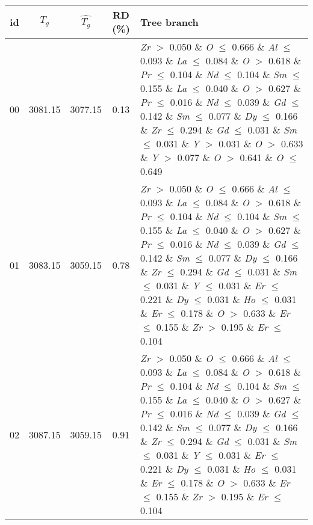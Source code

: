 \begin{table}[!htbp]
	\setlength{\tabcolsep}{3pt}
	\begin{tabular}{ccccp{}}
		\toprule
		id & $T_g$ & $\hat{T_g}$ & RD (\%) & Tree branch\\
		\midrule
		00 & 3081.15 & 3077.15 & 0.13 & \textit{Zr} $>$ 0.050 $\&$ \textit{O} $\le$ 0.666 $\&$ \textit{Al} $\le$ 0.093 $\&$ \textit{La} $\le$ 0.084 $\&$ \textit{O} $>$ 0.618 $\&$ \textit{Pr} $\le$ 0.104 $\&$ \textit{Nd} $\le$ 0.104 $\&$ \textit{Sm} $\le$ 0.155 $\&$ \textit{La} $\le$ 0.040 $\&$ \textit{O} $>$ 0.627 $\&$ \textit{Pr} $\le$ 0.016 $\&$ \textit{Nd} $\le$ 0.039 $\&$ \textit{Gd} $\le$ 0.142 $\&$ \textit{Sm} $\le$ 0.077 $\&$ \textit{Dy} $\le$ 0.166 $\&$ \textit{Zr} $\le$ 0.294 $\&$ \textit{Gd} $\le$ 0.031 $\&$ \textit{Sm} $\le$ 0.031 $\&$ \textit{Y} $>$ 0.031 $\&$ \textit{O} $>$ 0.633 $\&$ \textit{Y} $>$ 0.077 $\&$ \textit{O} $>$ 0.641 $\&$ \textit{O} $\le$ 0.649\\
		\hline
		01 & 3083.15 & 3059.15 & 0.78 & \textit{Zr} $>$ 0.050 $\&$ \textit{O} $\le$ 0.666 $\&$ \textit{Al} $\le$ 0.093 $\&$ \textit{La} $\le$ 0.084 $\&$ \textit{O} $>$ 0.618 $\&$ \textit{Pr} $\le$ 0.104 $\&$ \textit{Nd} $\le$ 0.104 $\&$ \textit{Sm} $\le$ 0.155 $\&$ \textit{La} $\le$ 0.040 $\&$ \textit{O} $>$ 0.627 $\&$ \textit{Pr} $\le$ 0.016 $\&$ \textit{Nd} $\le$ 0.039 $\&$ \textit{Gd} $\le$ 0.142 $\&$ \textit{Sm} $\le$ 0.077 $\&$ \textit{Dy} $\le$ 0.166 $\&$ \textit{Zr} $\le$ 0.294 $\&$ \textit{Gd} $\le$ 0.031 $\&$ \textit{Sm} $\le$ 0.031 $\&$ \textit{Y} $\le$ 0.031 $\&$ \textit{Er} $\le$ 0.221 $\&$ \textit{Dy} $\le$ 0.031 $\&$ \textit{Ho} $\le$ 0.031 $\&$ \textit{Er} $\le$ 0.178 $\&$ \textit{O} $>$ 0.633 $\&$ \textit{Er} $\le$ 0.155 $\&$ \textit{Zr} $>$ 0.195 $\&$ \textit{Er} $\le$ 0.104\\
		\hline
		02 & 3087.15 & 3059.15 & 0.91 & \textit{Zr} $>$ 0.050 $\&$ \textit{O} $\le$ 0.666 $\&$ \textit{Al} $\le$ 0.093 $\&$ \textit{La} $\le$ 0.084 $\&$ \textit{O} $>$ 0.618 $\&$ \textit{Pr} $\le$ 0.104 $\&$ \textit{Nd} $\le$ 0.104 $\&$ \textit{Sm} $\le$ 0.155 $\&$ \textit{La} $\le$ 0.040 $\&$ \textit{O} $>$ 0.627 $\&$ \textit{Pr} $\le$ 0.016 $\&$ \textit{Nd} $\le$ 0.039 $\&$ \textit{Gd} $\le$ 0.142 $\&$ \textit{Sm} $\le$ 0.077 $\&$ \textit{Dy} $\le$ 0.166 $\&$ \textit{Zr} $\le$ 0.294 $\&$ \textit{Gd} $\le$ 0.031 $\&$ \textit{Sm} $\le$ 0.031 $\&$ \textit{Y} $\le$ 0.031 $\&$ \textit{Er} $\le$ 0.221 $\&$ \textit{Dy} $\le$ 0.031 $\&$ \textit{Ho} $\le$ 0.031 $\&$ \textit{Er} $\le$ 0.178 $\&$ \textit{O} $>$ 0.633 $\&$ \textit{Er} $\le$ 0.155 $\&$ \textit{Zr} $>$ 0.195 $\&$ \textit{Er} $\le$ 0.104\\

\end{tabular}
\end{table}
